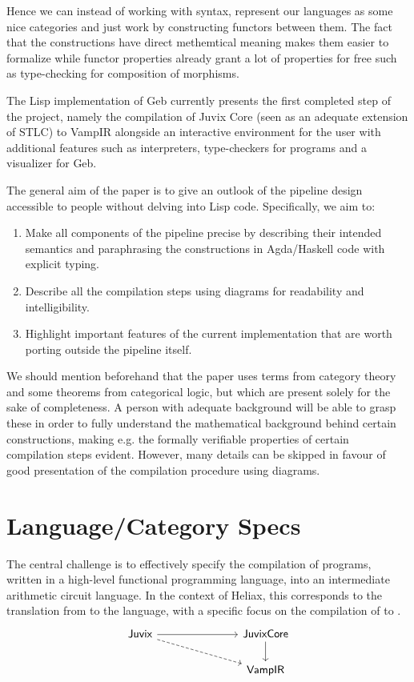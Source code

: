 Hence we can instead of working with syntax, represent our languages as some nice categories and just work by constructing functors between them. The fact that the constructions have direct methemtical meaning makes them easier to formalize while functor properties already grant a lot of properties for free such as type-checking for composition of morphisms.


The Lisp implementation of Geb currently presents the first completed step of the project, namely the compilation of Juvix Core (seen as an adequate extension of STLC) to VampIR alongside an interactive environment for the user with additional features such as interpreters, type-checkers for programs and a visualizer for Geb.

The general aim of the paper is to give an outlook of the pipeline design accessible to people without delving into Lisp code. Specifically, we aim to:

\begin{enumerate}
\item Make all components of the pipeline precise by describing their
intended semantics and paraphrasing the constructions in Agda/Haskell code
with explicit typing.
\item Describe all the compilation steps using diagrams for readability and
intelligibility.
\item  Highlight important features of the current implementation that are
worth porting outside the pipeline itself.
\end{enumerate}

We should mention beforehand that the paper uses terms from category theory and some theorems from categorical logic, but which are present solely for the sake of completeness. A person with adequate background will be able to grasp these in order to fully understand the mathematical background behind certain constructions, making e.g. the formally verifiable properties of certain compilation steps evident. However, many details can be skipped in favour of good presentation of the compilation procedure using diagrams.

\section{Language/Category Specs}

The central challenge is to effectively specify the compilation of
programs, written in a high-level functional programming language, into an
intermediate arithmetic circuit language. In the context of Heliax, this
corresponds to the translation from \Juvix{} to the \VampIR{} language, with a
specific focus on the compilation of \JuvixCore{} to \VampIR{}.
\[\begin{tikzcd}
	{\Juvix{}} &&& {\JuvixCore{}} \\
	&&& {\VampIR{}}
	\arrow[dashed, from=1-1, to=2-4]
	\arrow[from=1-1, to=1-4]
	\arrow[from=1-4, to=2-4]
\end{tikzcd}\]

